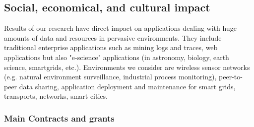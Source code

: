 \subsection{Social, economical, and cultural impact} %
\label{sub:hadas_social_economical_and_cultural_impact}

Results of our research have direct impact on applications dealing with huge amounts of data and resources in pervasive environments. 
They include traditional enterprise applications such as mining logs and traces, web applications but also "e-science" applications (in astronomy, biology, earth science, smartgrids, etc.). 
Environments we consider are wireless sensor networks (e.g. natural environment surveillance, industrial process monitoring), peer-to-peer data sharing, application deployment and maintenance for smart grids, transports, networks, smart cities.  

\subsubsection{Main Contracts and grants}


